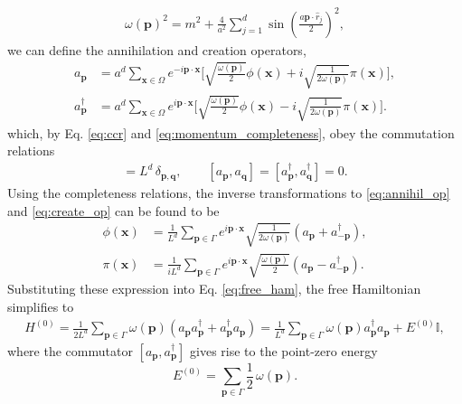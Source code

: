 \documentclass[a4paper,10pt]{report}
\begin{document}
\begin{align}
\omega(\mathbf{p})^2 = m^2 + \frac{4}{a^2}\sum_{j=1}^d\sin(\frac{a\mathbf{p}\cdot\hat{r}_j}{2})^2,
\end{align}
we can define the annihilation and creation operators,
\begin{align}
\label{eq:annihil_op}
a_\mathbf{p} &= a^d\sum_{\mathbf{x}\in\Omega}e^{-i\mathbf{p}\cdot\mathbf{x}}\bigg[\sqrt{\frac{\omega(\mathbf{p})}{2}}\phi(\mathbf{x}) + i\sqrt{\frac{1}{2\omega(\mathbf{p})}}\pi(\mathbf{x})\bigg], \\
\label{eq:create_op}
a^\dag_\mathbf{p} &= a^d\sum_{\mathbf{x}\in\Omega}e^{i\mathbf{p}\cdot\mathbf{x}}\bigg[\sqrt{\frac{\omega(\mathbf{p})}{2}}\phi(\mathbf{x}) - i\sqrt{\frac{1}{2\omega(\mathbf{p})}}\pi(\mathbf{x})\bigg].
\end{align}
which, by Eq. \eqref{eq:ccr} and \eqref{eq:momentum_completeness}, obey the commutation relations
\begin{align}
[a_\mathbf{p},a^\dag_\mathbf{q}] = L^d\,\delta_{\mathbf{p},\mathbf{q}}, \qquad [a_\mathbf{p},a_\mathbf{q}] = [a_\mathbf{p}^\dag,a_\mathbf{q}^\dag] = 0.
\label{eq:CCR}
\end{align}
Using the completeness relations, the inverse transformations to  \eqref{eq:annihil_op} and \eqref{eq:create_op} can be found to be
\begin{align}
\label{eq:field_op_phi}
\phi(\mathbf{x}) &= \frac{1}{L^d}\sum_{\mathbf{p}\in\Gamma}e^{i\mathbf{p}\cdot\mathbf{x}}\sqrt{\frac{1}{2\omega(\mathbf{p})}}(a_\mathbf{p} + a^\dag_{-\mathbf{p}}), \\
\label{eq:field_op_pi}
\pi(\mathbf{x}) &= \frac{1}{iL^d}\sum_{\mathbf{p}\in\Gamma}e^{i\mathbf{p}\cdot\mathbf{x}}\sqrt{\frac{\omega(\mathbf{p})}{2}}(a_\mathbf{p} - a^\dag_{-\mathbf{p}}).
\end{align}
Substituting these expression into Eq. \eqref{eq:free_ham}, the free Hamiltonian simplifies to
\begin{align}
H^{(0)} = \frac{1}{2L^d}\sum_{\mathbf{p}\in\Gamma}\omega(\mathbf{p})(a_\mathbf{p}a^\dag_\mathbf{p}+a^\dag_{\mathbf{p}}a_{\mathbf{p}}) = \frac{1}{L^d}\sum_{\mathbf{p}\in\Gamma}\omega(\mathbf{p})a^\dag_{\mathbf{p}}a_{\mathbf{p}} + E^{(0)}\mathbb{I},
\end{align}
where the commutator $[a_\mathbf{p},a_\mathbf{p}^\dag]$ gives rise to the point-zero energy
\begin{equation}
E^{(0)} = \sum_{\mathbf{p}\in\Gamma}\frac{1}{2}\,
\omega(\mathbf{p}).
\end{equation}
\end{document}
